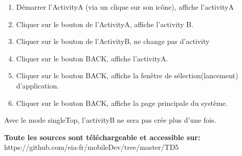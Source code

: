 	\begin{enumerate}
			\item Démarrer l'ActivityA (via un clique sur son icône), affiche l'activityA
			\item Cliquer sur le bouton de l’ActivityA, affiche l'activity B.
			\item  Cliquer sur le bouton de l’ActivityB, ne change pas d'activity
			\item Cliquer sur le bouton BACK, affiche l'activityA.
			\item Cliquer sur le bouton BACK, affiche la fenêtre de sélection(lancement) d'application.
			\item Cliquer sur le bouton BACK, affiche la page principale du système.
	\end{enumerate}
	
	Avec le mode singleTop, l'activityB ne sera pas crée plus d'une fois. 
	
	\vspace{1cm}
	\textbf{Toute les sources sont téléchargeable et accessible sur: }\\
	      https://github.com/eia-fr/mobileDev/tree/master/TD5 
